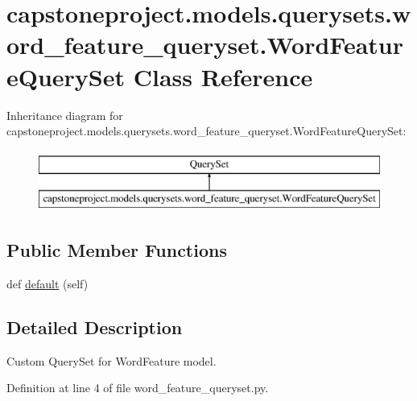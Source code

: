 \hypertarget{classcapstoneproject_1_1models_1_1querysets_1_1word__feature__queryset_1_1_word_feature_query_set}{}\section{capstoneproject.\+models.\+querysets.\+word\+\_\+feature\+\_\+queryset.\+Word\+Feature\+Query\+Set Class Reference}
\label{classcapstoneproject_1_1models_1_1querysets_1_1word__feature__queryset_1_1_word_feature_query_set}
Inheritance diagram for capstoneproject.\+models.\+querysets.\+word\+\_\+feature\+\_\+queryset.\+Word\+Feature\+Query\+Set\+:\begin{figure}[H]
\begin{center}
\leavevmode
\includegraphics[height=2.000000cm]{classcapstoneproject_1_1models_1_1querysets_1_1word__feature__queryset_1_1_word_feature_query_set}
\end{center}
\end{figure}
\subsection*{Public Member Functions}
\begin{DoxyCompactItemize}
\item 
def \mbox{\hyperlink{classcapstoneproject_1_1models_1_1querysets_1_1word__feature__queryset_1_1_word_feature_query_set_a529ecccd220e0e2f165e209c30273341}{default}} (self)
\end{DoxyCompactItemize}


\subsection{Detailed Description}
\begin{DoxyVerb}Custom QuerySet for WordFeature model.\end{DoxyVerb}
 

Definition at line 4 of file word\+\_\+feature\+\_\+queryset.\+py.



